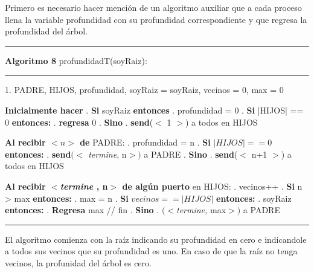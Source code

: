 \documentclass[8pt, letterpaper]{article}
\begin{document}
\begin{enumerate}
  Primero es necesario hacer mención de un algoritmo auxiliar que a cada proceso
  llena la variable profundidad con su profundidad correspondiente y que regresa
  la profundidad del árbol.

  \newpage
  \rule{1\textwidth}{0.2mm}
  {\bf Algoritmo 8} profundidadT(soyRaiz):
  \hfill\break
  \rule{1\textwidth}{0.2mm}
  1. PADRE, HIJOS, profundidad, soyRaiz = soyRaiz, vecinos = 0, max = 0
  
  \hfill\break
  \hspace*{.2cm} {\bf Inicialmente hacer}
  \hfill{}. {\bf Si} soyRaiz {\bf entonces}
  \hfill{}. \hspace{0.5cm} profundidad = 0
  \hfill{}. \hspace{0.5cm} {\bf Si} |HIJOS| == 0 {\bf entonces:}
  \hfill{}. \hspace{1cm} {\bf regresa} 0
  \hfill{}. \hspace{0.5cm} {\bf Sino}
  \hfill{}. \hspace{1cm} {\bf send}($<$ 1 $>$) a todos en HIJOS
  \hfill\break
  
  \hspace{0.2cm} {\bf Al recibir $< n >$ de } PADRE:
  \hfill{}. profundidad = n
  \hfill{}. {\bf Si} $|HIJOS| ==  0$ {\bf entonces:}
  \hfill{}. \hspace{.5cm} {\bf send}$(<$ {\it termine}, n$>)$ a PADRE
  \hfill{}. {\bf Sino} 
  \hfill{}. \hspace{1cm} {\bf send}($<$ n+1 $>$) a todos en HIJOS
  \hfill\break

  \hspace{0.2cm} {\bf Al recibir $<${\it termine }, n$>$ de algún puerto}
  en HIJOS:
  \hfill{}. vecinos++
  \hfill{}. {\bf Si} n > max {\bf entonces:}
  \hfill{}. \hspace{.5cm} max = n
  \hfill{}. {\bf Si} $vecinos ==  |HIJOS|$ {\bf entonces:}
  \hfill{}.\hspace{0.5cm}{\bf Si} soyRaiz {\bf entonces:}
  \hfill{}.\hspace{1cm} {\bf Regresa} max // fin 
  \hfill{}.\hspace{0.5cm} {\bf Sino}
  \hfill{}. \hspace{1cm}{\bf send}$(<${\it termine,} max$>)$ a PADRE
  \hfill\break
  \rule{1\textwidth}{0.2mm}
  El algoritmo comienza con la raíz indicando su profundidad en cero e
  indicandole a todos sus vecinos que su profundidad es uno. En caso de que
  la raíz no tenga vecinos, la profunidad del árbol es cero.


\end{enumerate}
\end{document}

